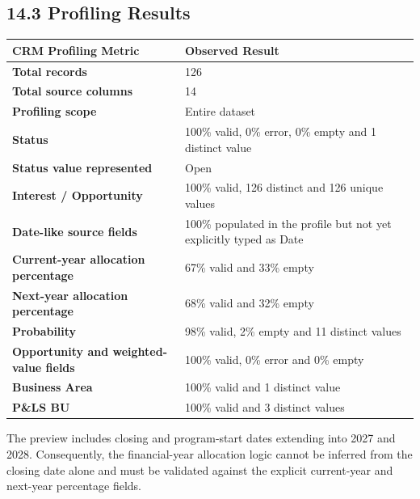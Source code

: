 \documentclass[11pt,a4paper]{article}
\begin{document}
\subsection{14.3 Profiling Results}

\begin{tabularx}{\textwidth}{
    >{\raggedright\arraybackslash\bfseries\color{AaltoNavy}}p{7cm}
    X
}

\toprule

CRM Profiling Metric
&
Observed Result
\\

\midrule

Total records
&
126
\\

Total source columns
&
14
\\

Profiling scope
&
Entire dataset
\\

Status
&
100\% valid, 0\% error, 0\% empty and 1 distinct value
\\

Status value represented
&
Open
\\

Interest / Opportunity
&
100\% valid, 126 distinct and 126 unique values
\\

Date-like source fields
&
100\% populated in the profile but not yet explicitly typed as Date
\\

Current-year allocation percentage
&
67\% valid and 33\% empty
\\

Next-year allocation percentage
&
68\% valid and 32\% empty
\\

Probability
&
98\% valid, 2\% empty and 11 distinct values
\\

Opportunity and weighted-value fields
&
100\% valid, 0\% error and 0\% empty
\\

Business Area
&
100\% valid and 1 distinct value
\\

P\&LS BU
&
100\% valid and 3 distinct values
\\

\bottomrule

\end{tabularx}

The preview includes closing and program-start dates extending into 2027 and
2028. Consequently, the financial-year allocation logic cannot be inferred
from the closing date alone and must be validated against the explicit
current-year and next-year percentage fields.
\end{document}
